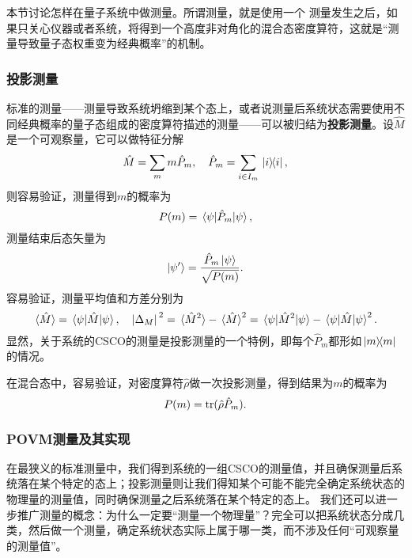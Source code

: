 \documentclass[UTF8, a4paper]{ctexart}
\begin{document}
本节讨论怎样在量子系统中做测量。所谓测量，就是使用一个
测量发生之后，如果只关心仪器或者系统，将得到一个高度非对角化的混合态密度算符，这就是“测量导致量子态权重变为经典概率”的机制。

\subsubsection{投影测量}

标准的测量——测量导致系统坍缩到某个态上，或者说测量后系统状态需要使用不同经典概率的量子态组成的密度算符描述的测量——可以被归结为\textbf{投影测量}。设$\hat{M}$是一个可观察量，它可以做特征分解
\begin{equation}
    \hat{M} = \sum_m m \hat{P}_m, \quad \hat{P}_m = \sum_{i \in I_m} \dyad*{i}{i},
\end{equation}
则容易验证，测量得到$m$的概率为
\begin{equation}
    P(m) = \mel*{\psi}{\hat{P}_m}{\psi},
\end{equation}
测量结束后态矢量为
\begin{equation}
    \ket{\psi'} = \frac{\hat{P}_m \ket{\psi}}{\sqrt{P(m)}}.
\end{equation}
容易验证，测量平均值和方差分别为
\begin{equation}
    \expval*{\hat{M}} = \mel*{\psi}{\hat{M}}{\psi}, \quad \abs*{\Delta_M}^2 = \expval*{\hat{M}^2} - \expval*{\hat{M}}^2 = \mel*{\psi}{\hat{M}^2}{\psi} - \mel*{\psi}{\hat{M}}{\psi}^2.
\end{equation}
显然，关于系统的CSCO的测量是投影测量的一个特例，即每个$\hat{P}_m$都形如$\dyad*{m}{m}$的情况。

在混合态中，容易验证，对密度算符$\hat{\rho}$做一次投影测量，得到结果为$m$的概率为
\begin{equation}
    P(m) = \trace(\hat{\rho} \hat{P}_m).
\end{equation}

\subsubsection{POVM测量及其实现}

在最狭义的标准测量中，我们得到系统的一组CSCO的测量值，并且确保测量后系统落在某个特定的态上；投影测量则让我们得知某个可能不能完全确定系统状态的物理量的测量值，同时确保测量之后系统落在某个特定的态上。
我们还可以进一步推广测量的概念：为什么一定要“测量一个物理量”？完全可以把系统状态分成几类，然后做一个测量，确定系统状态实际上属于哪一类，而不涉及任何“可观察量的测量值”。
\end{document}
